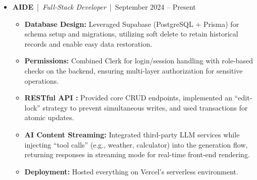 \documentclass[11pt]{article}
\begin{document}
\begin{itemize}[leftmargin=0pt, label={}, itemsep=0pt,
  topsep=0pt,
  parsep=0pt,
  partopsep=0pt]  %
  \item 
    \textbf{AIDE} \,|\, \textit{Full-Stack Developer } \,|\, 
 September 2024 -- Present
    \begin{itemize}[label=\textbullet, leftmargin=1.5em, itemsep=0pt, topsep=0pt, parsep=0pt, partopsep=0pt]
 \item \textbf{Database Design:} Leveraged Supabase (PostgreSQL + Prisma) for schema 
        setup and migrations, utilizing soft delete to retain historical records and enable 
        easy data restoration.

  \item \textbf{Permissions:} Combined Clerk for login/session handling with 
        role-based checks on the backend, ensuring multi-layer authorization for sensitive 
        operations.

  \item \textbf{RESTful API :} Provided core CRUD endpoints, implemented an 
        “edit-lock” strategy to prevent simultaneous writes, and used transactions for atomic updates.

  \item \textbf{AI Content Streaming:} Integrated third-party LLM services while injecting 
        “tool calls” (e.g., weather, calculator) into the generation flow, returning responses 
        in streaming mode for real-time front-end rendering.

  \item \textbf{Deployment:} Hosted everything on Vercel’s serverless environment.
      
\end{itemize}
\end{itemize}
\end{document}
